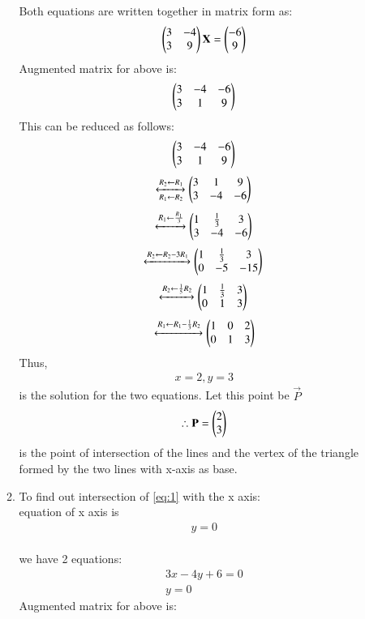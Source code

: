 \documentclass[journal,12pt,twocolumn]{IEEEtran}
\renewcommand\thesection{\arabic{section}}
\begin{document}
\begin{enumerate}[label=\thesection.\arabic*.,ref=\thesection.\theenumi]
\begin{enumerate}
Both equations are written together in matrix form as:
\begin{align}
    \begin{pmatrix}3 & -4 \\ 3 & 9\end{pmatrix}\mathbf{X}=
\begin{pmatrix}-6 \\ 9\end{pmatrix}
\end{align}
Augmented matrix for above is:
\begin{align}
    \begin{pmatrix}3 & -4 & -6\\
           3 & 1 & 9\end{pmatrix}
\end{align}
This can be reduced as follows:
 \[\begin{pmatrix}3 & -4 & -6\\
           3 & 1 & 9\end{pmatrix}\]\[
    \xleftrightarrow[R_1 \leftarrow R_2]
    {R_2 \leftarrow R_1}
    \begin{pmatrix}3 & 1 & 9\\
          3 & -4 & -6\end{pmatrix}\\\]\[
          \xleftrightarrow{R_1 \leftarrow \frac{R_1}{3}}
    \begin{pmatrix}1 &\frac{1}{3}&3\\
        3&-4&-6\end{pmatrix}\\\]\[
        \xleftrightarrow{R_2\leftarrow R_2-3R_1}
    \begin{pmatrix}1&\frac{1}{3}&3\\0&-5&-15\end{pmatrix}\\\]\[
    \xleftrightarrow{R_2\leftarrow \frac{1}{5}R_2}
    \begin{pmatrix}1&\frac{1}{3}&3\\0&1&3\end{pmatrix}\\\]\[
    \xleftrightarrow{R_1\leftarrow R_1-\frac{1}{3}R_2}
    \begin{pmatrix}1&0&2\\0&1&3\end{pmatrix}\]
Thus,
\begin{align}
    x=2, y=3
\end{align} 
is the solution for the two equations. 
Let this point be $\vec{P}$
\begin{align}
\therefore \mathbf{P}=\begin{pmatrix}2\\3\end{pmatrix}
\end{align}
is the point of intersection of the lines and the vertex of the triangle formed by the two lines with x-axis as base.
\item To find out intersection of \ref{eq:1} with the x axis:\\
    equation of x axis is 
    \begin{align}
        y=0
    \end{align}
    \\we have 2 equations: \begin{align}
        3x-4y+6=0 \\y=0
    \end{align}
    Augmented matrix for above is:
\begin{align}

\end{align}
\end{enumerate}
\end{enumerate}
\end{document}
